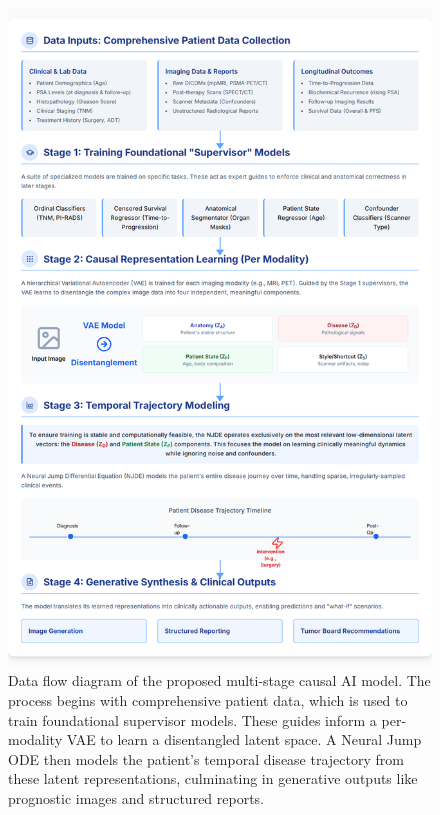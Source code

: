 \documentclass[11pt, a4paper]{article}
\begin{document}
\begin{figure}[H]
    \centering
    \includegraphics[width=\textwidth]{ml.png}
    \caption{Data flow diagram of the proposed multi-stage causal AI model. The process begins with comprehensive patient data, which is used to train foundational supervisor models. These guides inform a per-modality VAE to learn a disentangled latent space. A Neural Jump ODE then models the patient's temporal disease trajectory from these latent representations, culminating in generative outputs like prognostic images and structured reports.}
    \label{fig:ml_framework}
\end{figure}
\end{document}
